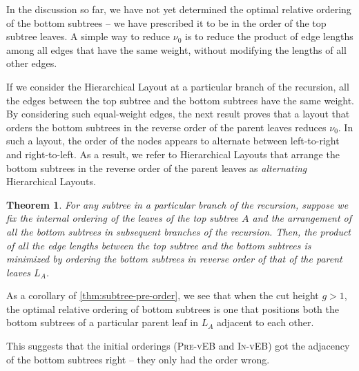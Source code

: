 \documentclass[10pt,conference,letterpaper]{IEEEtran}
\newtheorem{theorem}{Theorem}
\newcommand{\note}[1]{}
\newcommand{\comment}[1]{}
\newcommand{\nodes}{nodes\xspace}
\newcommand{\HL}{Hierarchical Layout\xspace}
\newcommand{\HLs}{Hierarchical Layouts\xspace}
\newcommand{\pvl}{\textsc{Pre-vEB}\xspace}
\newcommand{\ivl}{\textsc{In-vEB}\xspace}
\newcommand{\pwmean}[1][p]{\ensuremath{\nu_{#1}}\xspace}
\newcommand{\PB}{\ensuremath{\beta}\xspace}
\begin{document}
In the discussion so far, we have not yet determined the optimal relative ordering of the bottom subtrees -- we have prescribed it to be in the order of the top subtree leaves. A simple way to reduce \pwmean[0] is to reduce the product of edge lengths among all edges that have 
the same weight, without modifying the lengths of all other edges.
\note{But alternating does change the sum of lengths, only the product. So what do we mean by reducing edge lengths? Fixed.}
If we consider the \HL at a particular branch of the recursion, all the edges between the top subtree and the bottom subtrees have the same weight.
By considering such equal-weight edges, the next result proves that a layout that orders the bottom subtrees in the reverse order of the parent leaves reduces \pwmean[0]. In such a layout,
the order of the \nodes appears to alternate between left-to-right and right-to-left. As a result, we refer to \HLs that arrange the bottom subtrees in the reverse order of the parent leaves as \textit{alternating} \HLs.
\comment{
Observe that one must cut and order the top subtree completely before ordering the bottom subtrees at each branch of the recursion. 
}
\comment{
As a consequence, \autoref{thm:in-pre-edgelen} proves that \ivl has a lower weighted edge product than \pvl, which manifests itself in lower \PB and better cache-oblivious layouts. 
}

\begin{theorem}
For any subtree in a particular branch of the recursion, suppose we fix the internal ordering of the leaves of the top subtree $A$ and the arrangement of all the bottom subtrees in subsequent branches of the recursion. Then, the product of all the edge lengths between the top subtree and the bottom subtrees is minimized by ordering the bottom subtrees in reverse order of that of the parent leaves $L_A$.
\label{thm:subtree-pre-order}
\end{theorem}

As a corollary of \autoref{thm:subtree-pre-order}, we see that when the cut height $g>1$, the optimal relative ordering of bottom subtrees is one that positions both the bottom subtrees of a particular parent leaf in $L_A$ adjacent to each other.
\note{This is not true when $g = 1$ and the root is in-order. Yes, fixed.}
This suggests that the initial orderings (\pvl and \ivl) got the adjacency of the bottom subtrees right -- they only had the order wrong.
\end{document}
